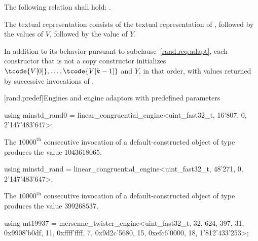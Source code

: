 \pnum
The following relation shall hold:
  .

\pnum
The textual representation
consists of
 the textual representation of ,
followed by
 the  values of $V$,
followed by
 the value of $Y$.

\pnum
In addition to its behavior
pursuant to subclause~\ref{rand.req.adapt},
each constructor%
that is not a copy constructor
initializes $\tcode{V[0]}, \dotsc, \tcode{V[k-1]}$ and $Y$,
in that order,
with values returned by successive invocations of .%




[rand.predef]{Engines and engine adaptors with predefined parameters}%
%
%

%
\begin{itemdecl}
using minstd_rand0 =
      linear_congruential_engine<uint_fast32_t, 16'807, 0, 2'147'483'647>;
\end{itemdecl}

\begin{itemdescr}
\pnum
\required
 The $10000^\text{th}$ consecutive invocation
 of a default-constructed object
 of type 
 produces the value $1043618065$.
\end{itemdescr}

%
\begin{itemdecl}
using minstd_rand =
      linear_congruential_engine<uint_fast32_t, 48'271, 0, 2'147'483'647>;
\end{itemdecl}

\begin{itemdescr}
\pnum
\required
 The $10000^\text{th}$ consecutive invocation
 of a default-constructed object
 of type 
 produces the value $399268537$.
\end{itemdescr}

%
\begin{itemdecl}
using mt19937 =
      mersenne_twister_engine<uint_fast32_t, 32, 624, 397, 31,
       0x9908'b0df, 11, 0xffff'ffff, 7, 0x9d2c'5680, 15, 0xefc6'0000, 18, 1'812'433'253>;
\end{itemdecl}

